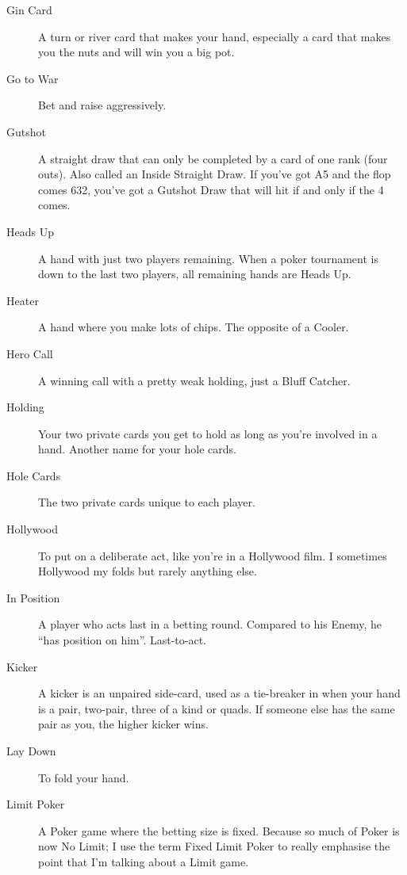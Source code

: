 \begin{description}
\item[Gin Card] A turn or river card that makes your hand, especially
a card that makes you the nuts and will win you a big pot.

\item[Go to War] Bet and raise aggressively.

\item[Gutshot] A straight draw that can only be completed by a card of
one rank (four outs). Also called an Inside Straight Draw. If you've
got A5 and the flop comes 632, you've got a Gutshot Draw that will hit
if and only if the 4 comes.

\item[Heads Up] A hand with just two players remaining. When a poker
tournament is down to the last two players, all remaining hands are
Heads Up.

\item[Heater] A hand where you make lots of chips. The opposite of a
Cooler.

\item[Hero Call] A winning call with a pretty weak holding, just a
Bluff Catcher.

\item[Holding] Your two private cards you get to hold as long as
you're involved in a hand. Another name for your hole cards.

\item[Hole Cards] The two private cards unique to each player.

\item[Hollywood] To put on a deliberate act, like you're in a
Hollywood film. I sometimes Hollywood my folds but rarely anything
else.

\item[In Position] A player who acts last in a betting round. Compared
to his Enemy, he ``has position on him''. Last-to-act.

\item[Kicker] A kicker is an unpaired side-card, used as a tie-breaker
in when your hand is a pair, two-pair, three of a kind or quads. If
someone else has the same pair as you, the higher kicker wins.

\item[Lay Down] To fold your hand.

\item[Limit Poker] A Poker game where the betting size is
fixed. Because so much of Poker is now No Limit; I use the term
Fixed Limit Poker to really emphasise the point that I'm talking about
a Limit game.


\end{description}
